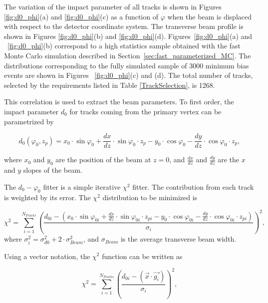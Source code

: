 \documentclass{cmspaper}
\begin{document}
The variation of the impact parameter of all tracks is shown in  Figures \ref{fig:d0_phi}(a) and  \ref{fig:d0_phi}(c) as  a function of $\varphi$ when 
the beam is displaced with respect to the detector coordinate system. The transverse 
beam profile is shown in Figures \ref{fig:d0_phi}(b) and \ref{fig:d0_phi}(d). 
Figures~\ref{fig:d0_phi}(a) and ~\ref{fig:d0_phi}(b) correspond to a high statistics sample obtained with the fast Monte Carlo simulation  
described in Section~\ref{sec:fast_parameterized_MC}.
The distributions corresponding to the fully simulated sample of 3000
minimum bias events are shown in Figures ~\ref{fig:d0_phi}(c) and (d). The total number of tracks, selected by the requirements listed in Table \ref{TrackSelection}, is 1268.



This correlation is used to extract the beam parameters. 
To first order, the impact parameter $d_0$ for tracks coming from the primary 
vertex can be parametrized by

\begin{equation}
d_{0}(\varphi_0,z_p) = x_0 \cdot \sin\varphi_0 + \frac{dx}{dz} \cdot \sin\varphi_0 
\cdot z_p - y_0 \cdot \cos\varphi_0 - \frac{dy}{dz} \cdot \cos\varphi_0\cdot z_p  ,
\end{equation}

\noindent
where $x_0$ and $y_0$ are the position of the beam at $z = 0$, and
$\frac{dx}{dz}$ and $\frac{dy}{dz}$ are the $x$ and $y$ slopes of the beam.


\noindent
The $d_0 - \varphi_0$ fitter is a simple iterative $\chi^2$ fitter.   
The contribution from each track is weighted by its error. %
The $\chi^2$ distribution to be minimized is

\begin{equation}
\chi^2  = \sum_{i=1}^{N_{Tracks}} \left( \frac{d_{0i}-(x_0 \cdot \sin\varphi_{0i} + \frac{dx}{dz} \cdot \sin\varphi_{0i} 
\cdot z_{pi} - y_0 \cdot \cos\varphi_{0i} - \frac{dy}{dz} \cdot \cos\varphi_{0i}\cdot
z_{pi})}{\sigma_i} \right)^2 ,
\end{equation}
where $\sigma_i^2 = \sigma_{d0}^2 + 2\cdot\sigma_{Beam}^2$, and $\sigma_{Beam}$ is the average transverse beam width. 


Using a vector notation, the $\chi^2$ function can be written as

\begin{equation}
\chi^2  = \sum_{i=1}^{N_{Tracks}} \left( \frac{d_{0i}-(\vec{x}\cdot\vec{g_i})}{\sigma_i}
 \right)^2,
\end{equation}
\end{document}
